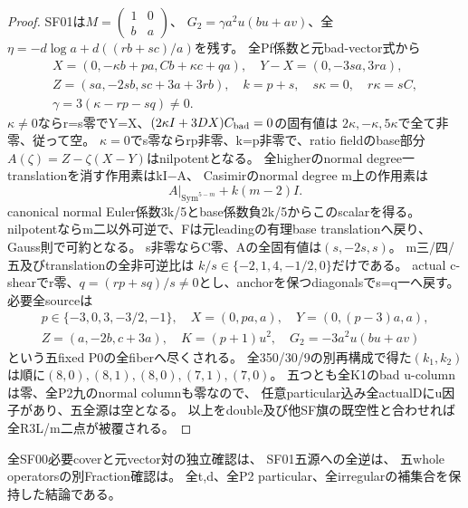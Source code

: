\documentclass[a4paper,11pt]{ltjsarticle}
\theoremstyle{definition}
\begin{document}
\begin{proof}
SF01は$M=\left(\begin{smallmatrix}1&0\\b&a\end{smallmatrix}\right)$、
$G_2=\gamma a^2u(bu+av)$、全$\eta=-d\log a+d((rb+sc)/a)$を残す。
全Pf係数と元bad-vector式から
\[
\begin{gathered}
 X=(0,-\kappa b+pa,Cb+\kappa c+qa),\quad Y-X=(0,-3sa,3ra),\\
 Z=(sa,-2sb,sc+3a+3rb),\quad k=p+s,\quad s\kappa=0,\quad r\kappa=sC,\\
 \gamma=3(\kappa-rp-sq)\ne0.
\end{gathered}
\]
$\kappa\ne0$ならr=s零でY=X、$(2\kappa I+3DX)C_{\rm bad}=0$の固有値は
$2\kappa,-\kappa,5\kappa$で全て非零、従って空。
$\kappa=0$でs零ならrp非零、k=p非零で、ratio fieldのbase部分
$A(\zeta)=Z-\zeta(X-Y)$はnilpotentとなる。
全higherのnormal degree一translationを消す作用素はkI−A、
Casimirのnormal degree m上の作用素は
\[
 A|_{\operatorname{Sym}^{5-m}}+k(m-2)I.
\]
canonical normal Euler係数3k/5とbase係数負2k/5からこのscalarを得る。
nilpotentならm二以外可逆で、Fは元leadingの有理base translationへ戻り、Gauss則で可約となる。
s非零ならC零、Aの全固有値は$(s,-2s,s)$。
m三/四/五及びtranslationの全非可逆比は
$k/s\in\{-2,1,4,-1/2,0\}$だけである。
actual c-shearでr零、$q=(rp+sq)/s\ne0$とし、anchorを保つdiagonalsでs=q一へ戻す。
必要全sourceは
\[
\begin{gathered}
 p\in\{-3,0,3,-3/2,-1\},\quad X=(0,pa,a),\quad Y=(0,(p-3)a,a),\\
 Z=(a,-2b,c+3a),\quad K=(p+1)u^2,\quad G_2=-3a^2u(bu+av)
\end{gathered}
\]
という五fixed P0の全fiberへ尽くされる。
全350/30/9の別再構成で得た$(k_1,k_2)$は順に$(8,0),(8,1),(8,0),(7,1),(7,0)$。
五つとも全K1のbad u-columnは零、全P2九のnormal columnも零なので、
任意particular込み全actualDにu因子があり、五全源は空となる。
以上をdouble及び他SF旗の既空性と合わせれば全R3L/m二点が被覆される。
\end{proof}
全SF00必要coverと元vector対の独立確認は、
SF01五源への全逆は、
五whole operatorsの別Fraction確認は。
全t,d、全P2 particular、全irregularの補集合を保持した結論である。
\end{document}
